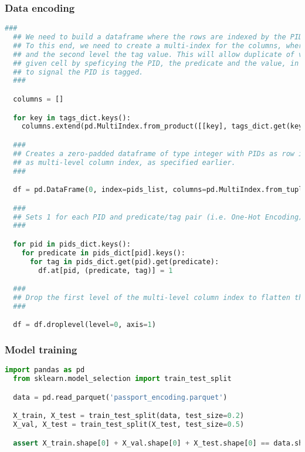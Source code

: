 \subsubsection{Data encoding}


\begin{lstlisting}[language=Python, caption=Pandas DataFrame generation for the one-hot encoded data]
  ###
  ## We need to build a dataframe where the rows are indexed by the PIDs, and the columns indexed by the Passport tags.
  ## To this end, we need to create a multi-index for the columns, where the first level is the tag predicate,
  ## and the second level the tag value. This will allow duplicate of values across predicates, and access to any
  ## given cell by speficying the PID, the predicate and the value, in order for the algorithm to set the value "1"
  ## to signal the PID is tagged.
  ###

  columns = []

  for key in tags_dict.keys():
    columns.extend(pd.MultiIndex.from_product([[key], tags_dict.get(key)]))

  ###
  ## Creates a zero-padded dataframe of type integer with PIDs as row indexes and the Passport predicates and tags
  ## as multi-level column index, as specified earlier.
  ###

  df = pd.DataFrame(0, index=pids_list, columns=pd.MultiIndex.from_tuples(columns), dtype='uint8')

  ###
  ## Sets 1 for each PID and predicate/tag pair (i.e. One-Hot Encoding)
  ###

  for pid in pids_dict.keys():
    for predicate in pids_dict[pid].keys():
      for tag in pids_dict.get(pid).get(predicate):
        df.at[pid, (predicate, tag)] = 1

  ###
  ## Drop the first level of the multi-level column index to flatten the dataframe, now that it is no longer needed.
  ###

  df = df.droplevel(level=0, axis=1)
\end{lstlisting}

\subsubsection{Model training}

\begin{lstlisting}[language=Python, caption=Dataset splitting]
  import pandas as pd
  from sklearn.model_selection import train_test_split

  data = pd.read_parquet('passport_encoding.parquet')

  X_train, X_test = train_test_split(data, test_size=0.2)
  X_val, X_test = train_test_split(X_test, test_size=0.5)

  assert X_train.shape[0] + X_val.shape[0] + X_test.shape[0] == data.shape[0]
\end{lstlisting}

